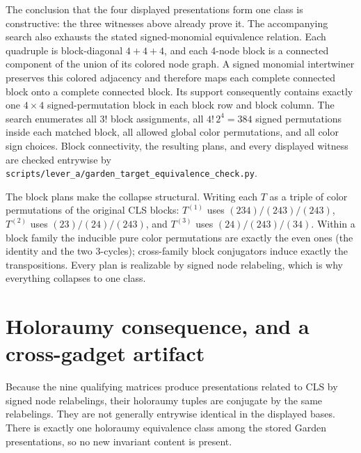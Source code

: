 \documentclass[11pt]{article}
\newcommand{\pathcode}[1]{\nolinkurl{#1}}
\begin{document}
The conclusion that the four displayed presentations form one class is
constructive: the three witnesses above already prove it.  The accompanying
search also exhausts the stated signed-monomial equivalence relation.  Each
quadruple is block-diagonal $4{+}4{+}4$, and each 4-node block is a connected
component of the union of its colored node graph.  A signed monomial
intertwiner preserves this colored adjacency and therefore maps each complete
connected block onto a complete connected block.  Its support consequently
contains exactly one $4\times4$ signed-permutation block in each block row and
block column.  The search enumerates all $3!$ block assignments, all
$4!\,2^4=384$ signed permutations inside each matched block, all allowed
global color permutations, and all color sign choices.  Block connectivity,
the resulting plans, and every displayed witness are checked entrywise by
\pathcode{scripts/lever_a/garden_target_equivalence_check.py}.

The block plans make the collapse structural.  Writing each $T$ as a triple
of color permutations of the original CLS blocks:
$T^{(1)}$ uses $(234)/(243)/(243)$, $T^{(2)}$ uses $(23)/(24)/(243)$, and
$T^{(3)}$ uses $(24)/(243)/(34)$.  Within a block family the inducible pure
color permutations are exactly the even ones (the identity and the two
3-cycles); cross-family block conjugators induce exactly the transpositions.
Every plan is realizable by signed node relabeling, which is why everything
collapses to one class.

\section{Holoraumy consequence, and a cross-gadget artifact}

Because the nine qualifying matrices produce presentations related to CLS by
signed node relabelings, their holoraumy tuples are conjugate by the same
relabelings.  They are not generally entrywise identical in the displayed
bases.  There is exactly one holoraumy equivalence class among the stored
Garden presentations, so no new invariant content is present.
\end{document}
